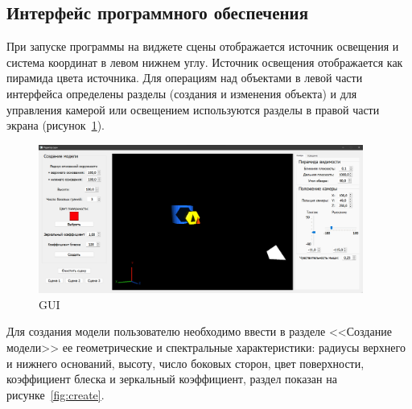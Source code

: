 \clearpage



\clearpage





\clearpage

\subsection{Интерфейс программного обеспечения}

При запуске программы на виджете сцены отображается источник освещения и система координат в левом нижнем углу. Источник освещения отображается как пирамида цвета источника.
Для операциям над объектами в левой части интерфейса определены разделы (создания и изменения объекта) и для управления камерой или освещением используются разделы в правой части экрана (рисунок~\ref{fig:example}).

\begin{figure}[h]
	\centering
	\includegraphics[width=0.95\textwidth]{img/examples/example.png}
	\caption{GUI}
	\label{fig:example}
\end{figure}

Для создания модели пользователю необходимо ввести в разделе <<Создание модели>> ее геометрические и спектральные характеристики: радиусы верхнего и нижнего оснований, высоту, число боковых сторон, цвет поверхности, коэффициент блеска и зеркальный коэффициент, раздел показан на рисунке~\ref{fig:create}.

\clearpage

